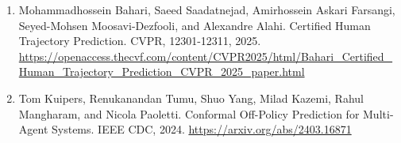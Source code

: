 \documentclass[10pt,twocolumn,letterpaper]{article}
\begin{document}
\begin{enumerate}
\item Mohammadhossein Bahari, Saeed Saadatnejad, Amirhossein Askari Farsangi, Seyed-Mohsen Moosavi-Dezfooli, and Alexandre Alahi. Certified Human Trajectory Prediction. CVPR, 12301-12311, 2025. \url{https://openaccess.thecvf.com/content/CVPR2025/html/Bahari_Certified_Human_Trajectory_Prediction_CVPR_2025_paper.html}

\item Tom Kuipers, Renukanandan Tumu, Shuo Yang, Milad Kazemi, Rahul Mangharam, and Nicola Paoletti. Conformal Off-Policy Prediction for Multi-Agent Systems. IEEE CDC, 2024. \url{https://arxiv.org/abs/2403.16871}

\end{enumerate}
\end{document}
